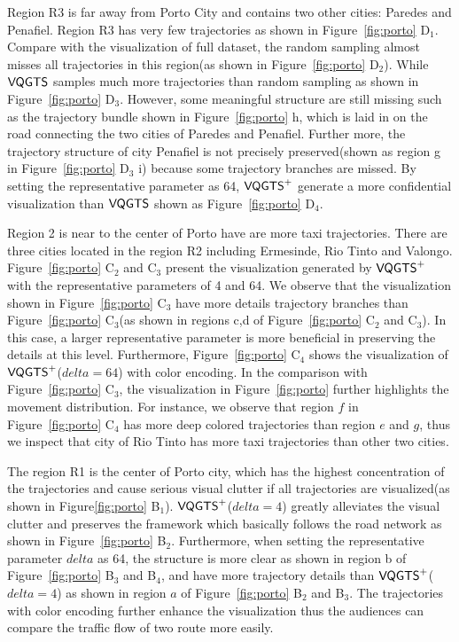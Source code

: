 Region R3 is far away from Porto City and contains two other cities: Paredes and Penafiel. Region R3 has very few trajectories as shown in Figure~\ref{fig:porto} D$_1$.  Compare with the visualization of full dataset, the random sampling almost misses all trajectories in this region(as shown in Figure~\ref{fig:porto} D$_2$). While $\mathsf{VQGTS}$ samples much more trajectories than random sampling as shown in Figure~\ref{fig:porto} D$_3$. However, some meaningful structure are still missing such as the trajectory bundle shown in Figure~\ref{fig:porto} h, which is laid in on the road  connecting the two cities of Paredes and Penafiel. Further more, the trajectory structure of city Penafiel is not precisely preserved(shown as region g in Figure~\ref{fig:porto} D$_3$ i) because some  trajectory branches are missed.
By setting the representative parameter as 64, $\mathsf{VQGTS}^{+}$ generate a more confidential visualization than $\mathsf{VQGTS}$ shown as Figure~\ref{fig:porto} D$_4$.

Region 2 is near to the center of Porto have are more taxi trajectories. There are three cities located in the region R2 including Ermesinde, Rio Tinto and Valongo.
Figure~\ref{fig:porto} C$_2$ and C$_3$ present the visualization generated by $\mathsf{VQGTS}^{+}$ with the representative parameters of 4 and 64. We observe that the visualization shown in Figure~\ref{fig:porto} C$_3$ have more details trajectory branches than Figure~\ref{fig:porto} C$_3$(as shown in regions c,d of Figure~\ref{fig:porto} C$_2$ and C$_3$). In this case, a larger representative parameter is more beneficial in preserving the details at this level. Furthermore, Figure~\ref{fig:porto} C$_4$ shows the visualization of $\mathsf{VQGTS}^{+}$($delta = 64$) with color encoding. In the comparison with Figure~\ref{fig:porto} C$_3$, the visualization in Figure~\ref{fig:porto} further highlights the movement distribution.
For instance, we observe that region $f$ in Figure~\ref{fig:porto} C$_4$ has more deep colored trajectories than region $e$ and $g$, thus we inspect that city of Rio Tinto has more taxi trajectories than other two cities.

The region R1 is the center of Porto city, which has the highest concentration of the trajectories and cause serious visual clutter if all trajectories are visualized(as shown in Figure\ref{fig:porto} B$_1$). $\mathsf{VQGTS}^{+}$($delta = 4$) greatly alleviates the visual clutter and preserves the framework which basically follows the road network as shown in Figure~\ref{fig:porto} B$_2$. Furthermore, when setting the representative parameter $delta$ as 64, the structure is more clear as shown in region b of Figure~\ref{fig:porto} B$_3$ and B$_4$, and have more trajectory details than $\mathsf{VQGTS}^{+}$($delta = 4$) as shown in region $a$ of Figure~\ref{fig:porto} B$_2$ and B$_3$. The trajectories with color encoding further enhance the visualization thus the audiences can compare the traffic flow of two route more easily.


